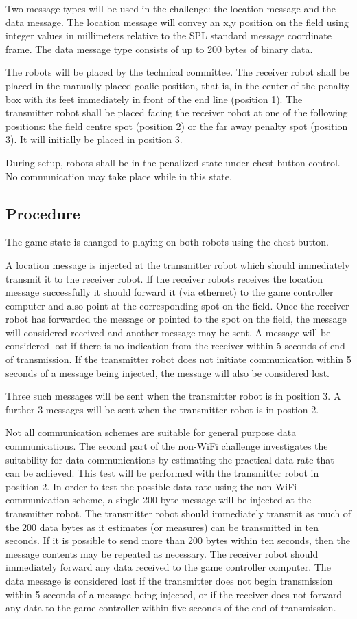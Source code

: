 \documentclass[12pt]{article}
\begin{document}
Two message types will be used in the challenge: the location message and the data message. The location message will convey an x,y position on the field using integer values in millimeters relative to the SPL standard message coordinate frame.
The data message type consists of up to 200 bytes of binary data.

The robots will be placed by the technical committee. 
The receiver robot shall be placed in the manually placed goalie
position, that is, in the center of the penalty box with its feet immediately in front of the end line (position 1).
The transmitter robot shall be placed facing the receiver robot at one of the following positions: the field centre spot (position 2) or the far away penalty spot (position 3). It will initially be placed in position 3.

During setup, robots shall be in the penalized state under chest button control. No communication may take place while in this state.

\subsection{Procedure}
The game state is changed to playing on both robots using the chest button.

A location message is injected at the transmitter robot which should immediately transmit it to the receiver robot.
If the receiver robots receives the location message successfully it should forward it (via ethernet) to the game controller computer and also point at the corresponding spot on the field. Once the receiver robot has forwarded the message or pointed to the spot on the field, the message will considered received and another message may be sent. A message will be considered lost if there is no indication from the receiver within 5 seconds of end of transmission. If the transmitter robot does not initiate communication within 5 seconds of a message being  injected, the message will also be considered lost.

Three such messages will be sent when the transmitter robot is in position 3. A further 3 messages will be sent when the transmitter robot is in postion 2.

Not all communication schemes are suitable for general purpose data communications. The second part of the non-WiFi challenge investigates the suitability for data communications by estimating the practical data rate that can be achieved. This test will be performed with the transmitter robot in position 2.
In order to test the possible data rate using the non-WiFi communication scheme, a single 200 byte message will be injected at the transmitter robot. The transmitter robot should immediately transmit as much of the 200 data bytes as it estimates (or measures) can be transmitted in ten seconds. If it is possible to send more than 200 bytes within ten seconds, then the message contents may be repeated as necessary. The receiver robot should immediately forward any data received to the game controller computer. The data message is considered lost if the transmitter does not begin transmission within 5 seconds of a message being injected, or if the receiver does not forward any data to the game controller within five seconds of the end of transmission.
\end{document}
